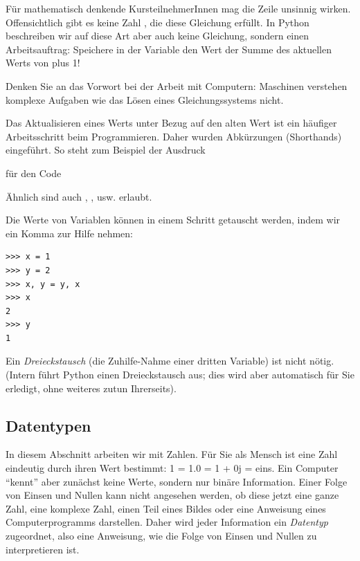 \begin{warnbox}
Für mathematisch denkende KursteilnehmerInnen mag die Zeile  unsinnig wirken. Offensichtlich gibt es keine Zahl , die diese Gleichung erfüllt. In Python beschreiben wir auf diese Art aber auch keine Gleichung, sondern einen Arbeitsauftrag: Speichere in der Variable  den Wert der Summe des aktuellen Werts von  plus 1!

Denken Sie an das Vorwort bei der Arbeit mit Computern: Maschinen verstehen komplexe Aufgaben wie das Lösen eines Gleichungssystems nicht.
\end{warnbox}

\begin{hintbox}[Shorthands]
Das Aktualisieren eines Werts unter Bezug auf den alten Wert ist ein häufiger Arbeitsschritt beim Programmieren. Daher wurden Abkürzungen (Shorthands) eingeführt. So steht zum Beispiel der Ausdruck
\begin{center}
\end{center}
für den Code
\begin{center}
\end{center}
Ähnlich sind auch , , usw. erlaubt.
\end{hintbox}

Die Werte von Variablen können in einem Schritt getauscht werden, indem wir ein Komma zur Hilfe nehmen:
\begin{cmdbox}
\begin{verbatim}
>>> x = 1
>>> y = 2
>>> x, y = y, x
>>> x
2
>>> y
1
\end{verbatim}
\end{cmdbox}
Ein \emph{Dreieckstausch} (\ie die Zuhilfe-Nahme einer dritten Variable) ist nicht nötig. (Intern führt Python einen Dreieckstausch aus; dies wird aber automatisch für Sie erledigt, ohne weiteres zutun Ihrerseits).


\subsection{Datentypen} \label{sub:datatypes}
In diesem Abschnitt arbeiten wir mit Zahlen. Für Sie als Mensch ist eine Zahl eindeutig durch ihren Wert bestimmt: 1 = 1.0 = 1 + 0j = eins. Ein Computer \enquote{kennt} aber zunächst keine Werte, sondern nur binäre Information. Einer Folge von Einsen und Nullen kann nicht angesehen werden, ob diese jetzt eine ganze Zahl, eine komplexe Zahl, einen Teil eines Bildes oder eine Anweisung eines Computerprogramms darstellen. Daher wird jeder Information ein \emph{Datentyp} zugeordnet, also eine Anweisung, wie die Folge von Einsen und Nullen zu interpretieren ist.


